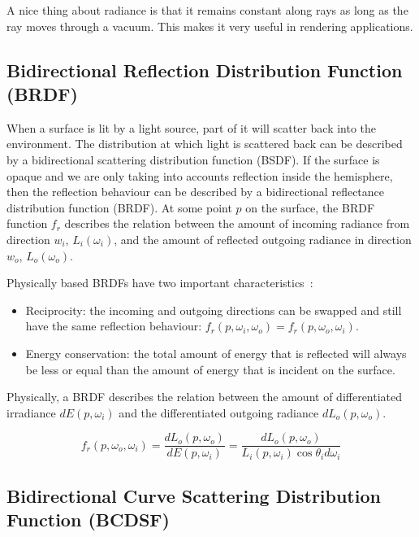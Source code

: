 \documentclass[11pt,a4paper]{report}
\begin{document}
A nice thing about radiance is that it remains constant along rays as long as the ray moves through a vacuum. This makes it very useful in rendering applications.

\subsection{Bidirectional Reflection Distribution Function (BRDF)}

When a surface is lit by a light source, part of it will scatter back into the environment. The distribution at which light is scattered back can be described by a bidirectional scattering distribution function (BSDF). If the surface is opaque and we are only taking into accounts reflection inside the hemisphere, then the reflection behaviour can be described by a bidirectional reflectance distribution function (BRDF). At some point $p$ on the surface, the BRDF function $f_r$ describes the relation between the amount of incoming radiance from direction $w_i$, $L_i(\omega_i)$, and the amount of reflected outgoing radiance in direction $w_o$, $L_o(\omega_o)$.

Physically based BRDFs have two important characteristics~\cite{pharr2017}:

\begin{itemize}
\item Reciprocity: the incoming and outgoing directions can be swapped and still have the same reflection behaviour: $f_r(p, \omega_i, \omega_o) = f_r(p, \omega_o, \omega_i)$.
\item Energy conservation: the total amount of energy that is reflected will always be less or equal than the amount of energy that is incident on the surface.
\end{itemize}

Physically, a BRDF describes the relation between the amount of differentiated irradiance $dE(p, \omega_i)$ and the differentiated outgoing radiance $dL_o(p, \omega_o)$. 

\begin{equation}
f_r(p, \omega_o, \omega_i) = \frac{dL_o(p, \omega_o)}{dE(p,\omega_i)} = \frac{dL_o(p, \omega_o)}{L_i(p, \omega_i) \cos \theta_i d\omega_i}
\end{equation}

\subsection{Bidirectional Curve Scattering Distribution Function (BCDSF)}
\label{sec_bcsdf}
\end{document}
